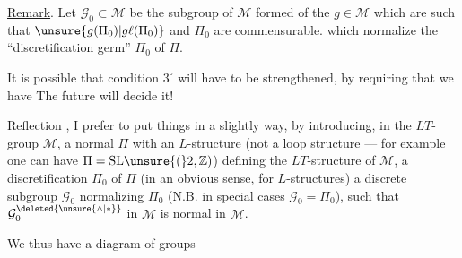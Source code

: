 \uline{Remark}. Let \(\mathcal{G}_0\subset\mathcal{M}\) be the subgroup of \(\mathcal{M}\) formed of the \(g\in\mathcal{M}\) which are such that \(\unsure{g(\Pi_0)|g\ell(\Pi_0)}\) and \(\Pi_0\) are commensurable.   which normalize the ``discretification germ'' \(\Pi_0\) of \(\Pi\).


It is possible that condition \(3^\circ\) will have to be strengthened, by requiring that we have
The future will decide it!


Reflection , I prefer to put things in a slightly  way, by introducing, in the  \(LT\)-group \(\mathcal{M}\), a normal   \(\Pi\) with an \(L\)-structure (not  a loop structure --- for example one can have \(\Pi=\mathrm{SL}\unsure{(}2,\mathbb{Z})\)) defining the \(LT\)-structure of \(\mathcal{M}\), a discretification \(\Pi_0\) of \(\Pi\) (in an obvious sense, for \(L\)-structures) a discrete subgroup \(\mathcal{G}_0\)  normalizing \(\Pi_0\) (N.B. in  special cases  \(\mathcal{G}_0=\Pi_0\)), such that  \(\mathcal{G}_0^{\deleted{\unsure{\wedge|*}}}\)  in \(\mathcal{M}\) is normal in \(\mathcal{M}\).

We thus have a diagram of groups

